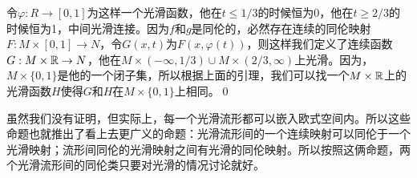 \proof 令$\varphi:R\to [0,1]$为这样一个光滑函数，他在$t\leq 1/3$的时候恒为0，他在$t\geq 2/3$的时候恒为1，中间光滑连接。因为$f$和$g$是同伦的，必然存在连续的同伦映射$F:M\times [0,1]\to N$，令$G(x,t)$为$F(x,\varphi(t))$，则这样我们定义了连续函数$G:M\times \mathbb{R} \to N$，他在$M\times (-\infty,1/3)\cup M\times (2/3,\infty)$上光滑。因为，$M\times \{0,1\}$是他的一个闭子集，所以根据上面的引理，我们可以找一个$M\times \mathbb{R}$上的光滑函数$H$使得$G$和$H$在$M\times \{0,1\}$上相同。\qed

虽然我们没有证明，但实际上，每一个光滑流形都可以嵌入欧式空间内。所以这些命题也就推出了看上去更广义的命题：光滑流形间的一个连续映射可以同伦于一个光滑映射；流形间同伦的光滑映射之间有光滑的同伦映射。所以按照这俩命题，两个光滑流形间的同伦类只要对光滑的情况讨论就好。